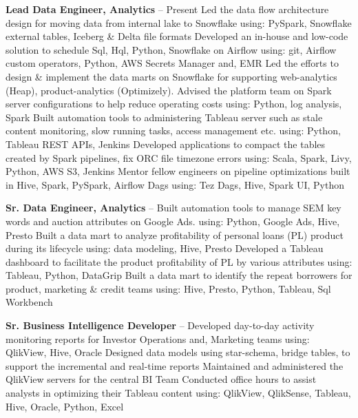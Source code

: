 \documentclass[letterpaper,MMMyyyy,nonstopmode]{simpleresumecv}
\begin{document}
\begin{Body}
\begingroup
\textbf{Lead Data Engineer, Analytics}
\hfill
{} --
Present
\BulletItem
Led the data flow architecture design for moving data from internal lake to Snowflake
\SubBulletItem using: PySpark, Snowflake external tables, Iceberg \& Delta file formats
\BulletItem Developed an in-house and low-code solution to schedule Sql, Hql, Python, Snowflake on Airflow
\SubBulletItem using: git, Airflow custom operators, Python, AWS Secrets Manager and, EMR
\BulletItem
Led the efforts to design \& implement the data marts on Snowflake for supporting web-analytics (Heap), product-analytics (Optimizely).
\BulletItem Advised the platform team on Spark server configurations to help reduce operating costs
\SubBulletItem using: Python, log analysis, Spark
\BulletItem Built automation tools to administering Tableau server such as stale content monitoring, slow running tasks, access management etc.
\SubBulletItem using: Python, Tableau REST APIs, Jenkins
\BulletItem Developed applications to compact the tables created by Spark pipelines, fix ORC file timezone errors
\SubBulletItem using: Scala, Spark, Livy, Python, AWS S3, Jenkins
\BulletItem Mentor fellow engineers on pipeline optimizations built in Hive, Spark, PySpark, Airflow Dags
\SubBulletItem using: Tez Dags, Hive, Spark UI, Python
\endgroup

\newpage
\BigGap

\BigGap

\begingroup
\textbf{Sr. Data Engineer, Analytics}
\hfill
{} --
\BulletItem Built automation tools to manage SEM key words and auction attributes on Google Ads.
\SubBulletItem using: Python, Google Ads, Hive, Presto
\BulletItem Built a data mart to analyze profitability of personal loans (PL) product during its lifecycle
\SubBulletItem using: data modeling, Hive, Presto
\BulletItem Developed a Tableau dashboard to facilitate the product profitability of PL by various attributes
\SubBulletItem using: Tableau, Python, DataGrip
\BulletItem Built a data mart to identify the repeat borrowers for product, marketing \& credit teams
\SubBulletItem using: Hive, Presto, Python, Tableau, Sql Workbench


\endgroup

\BigGap

\begingroup
\textbf{Sr. Business Intelligence Developer}
\hfill
{} --
\BulletItem Developed day-to-day activity monitoring reports for Investor Operations and, Marketing teams
\SubBulletItem using: QlikView, Hive, Oracle
\BulletItem Designed data models using star-schema, bridge tables, to support the incremental and real-time reports
\BulletItem Maintained and administered the QlikView servers for the central BI Team
\BulletItem Conducted office hours to assist analysts in optimizing their Tableau content
\SubBulletItem using: QlikView, QlikSense, Tableau, Hive, Oracle, Python, Excel


\end{Body}
\end{document}
